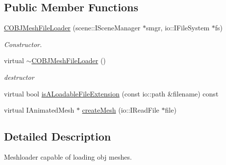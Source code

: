 \subsection*{Public Member Functions}
\begin{DoxyCompactItemize}
\item 
\hypertarget{classirr_1_1scene_1_1_c_o_b_j_mesh_file_loader_aca2a1d7438a63adfc9314c0ba8b2167c}{\hyperlink{classirr_1_1scene_1_1_c_o_b_j_mesh_file_loader_aca2a1d7438a63adfc9314c0ba8b2167c}{C\-O\-B\-J\-Mesh\-File\-Loader} (scene\-::\-I\-Scene\-Manager $\ast$smgr, io\-::\-I\-File\-System $\ast$fs)}\label{classirr_1_1scene_1_1_c_o_b_j_mesh_file_loader_aca2a1d7438a63adfc9314c0ba8b2167c}

\begin{DoxyCompactList}\small\item\em Constructor. \end{DoxyCompactList}\item 
\hypertarget{classirr_1_1scene_1_1_c_o_b_j_mesh_file_loader_add3ceecef93946c5e6e43daa510098c0}{virtual \hyperlink{classirr_1_1scene_1_1_c_o_b_j_mesh_file_loader_add3ceecef93946c5e6e43daa510098c0}{$\sim$\-C\-O\-B\-J\-Mesh\-File\-Loader} ()}\label{classirr_1_1scene_1_1_c_o_b_j_mesh_file_loader_add3ceecef93946c5e6e43daa510098c0}

\begin{DoxyCompactList}\small\item\em destructor \end{DoxyCompactList}\item 
virtual bool \hyperlink{classirr_1_1scene_1_1_c_o_b_j_mesh_file_loader_a1ba239186df69840429882c9006732fd}{is\-A\-Loadable\-File\-Extension} (const io\-::path \&filename) const 
\item 
virtual I\-Animated\-Mesh $\ast$ \hyperlink{classirr_1_1scene_1_1_c_o_b_j_mesh_file_loader_a5a44b6c5a347c108e8dadeb252519909}{create\-Mesh} (io\-::\-I\-Read\-File $\ast$file)
\end{DoxyCompactItemize}


\subsection{Detailed Description}
Meshloader capable of loading obj meshes. 

